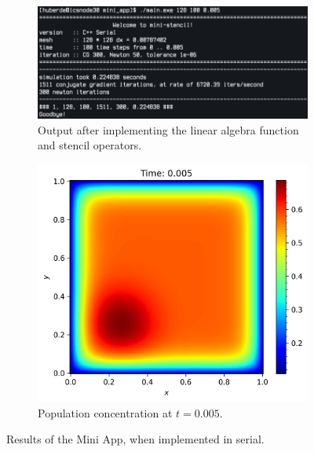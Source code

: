 \begin{figure}[H]
    \centering
    \begin{subfigure}[b]{0.6\textwidth}
        \centering
	\includegraphics[width=\textwidth]{../media/serial_output.png}
	\caption{Output after implementing the linear algebra function and stencil operators.}
	\label{fig:serial}
    \end{subfigure}
    \hfill 
    \begin{subfigure}[b]{0.39\textwidth}
        \centering
\includegraphics[width=\textwidth]{../media/output_serial.png}
	\caption{Population concentration at $t=0.005$.}
	\label{fig:output_serial}

    \end{subfigure}
    \caption{Results of the Mini App, when implemented in serial.}
    \label{fig:mini_app}
\end{figure}
